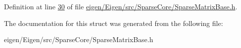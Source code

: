 Definition at line \hyperlink{eigen_2_eigen_2src_2_sparse_core_2_sparse_matrix_base_8h_source_l00030}{30} of file \hyperlink{eigen_2_eigen_2src_2_sparse_core_2_sparse_matrix_base_8h_source}{eigen/\+Eigen/src/\+Sparse\+Core/\+Sparse\+Matrix\+Base.\+h}.



The documentation for this struct was generated from the following file\+:\begin{DoxyCompactItemize}
\item 
eigen/\+Eigen/src/\+Sparse\+Core/\+Sparse\+Matrix\+Base.\+h\end{DoxyCompactItemize}
